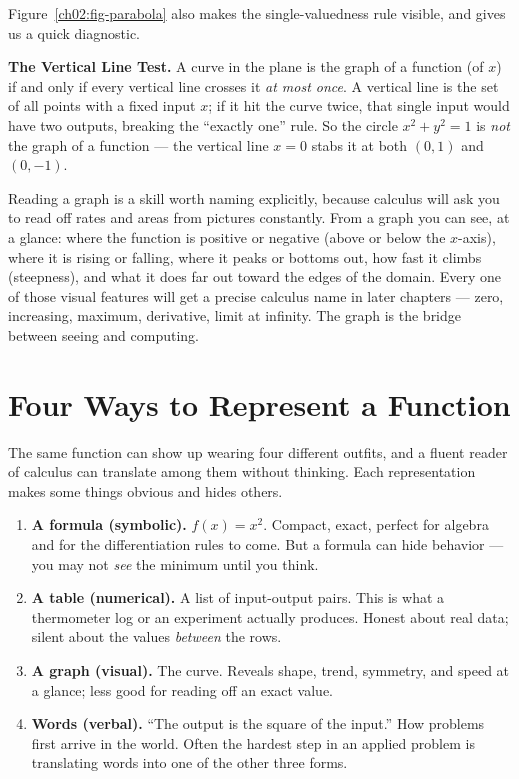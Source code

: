 Figure~\ref{ch02:fig-parabola} also makes the single-valuedness rule visible, and
gives us a quick diagnostic.

\begin{focusbox}
\textbf{The Vertical Line Test.}\quad
A curve in the plane is the graph of a function (of $x$) if and only if every
vertical line crosses it \emph{at most once}. A vertical line is the set of all
points with a fixed input $x$; if it hit the curve twice, that single input would
have two outputs, breaking the ``exactly one'' rule. So the circle $x^2+y^2=1$ is
\emph{not} the graph of a function --- the vertical line $x=0$ stabs it at both
$(0,1)$ and $(0,-1)$.
\end{focusbox}

Reading a graph is a skill worth naming explicitly, because calculus will ask you
to read off rates and areas from pictures constantly. From a graph you can see, at
a glance: where the function is positive or negative (above or below the
$x$-axis), where it is rising or falling, where it peaks or bottoms out, how fast
it climbs (steepness), and what it does far out toward the edges of the domain.
Every one of those visual features will get a precise calculus name in later
chapters --- zero, increasing, maximum, derivative, limit at infinity. The graph is
the bridge between seeing and computing.

\section{Four Ways to Represent a Function}
\label{ch02:four-representations}

The same function can show up wearing four different outfits, and a fluent reader
of calculus can translate among them without thinking. Each representation makes
some things obvious and hides others.

\begin{enumerate}
  \item \textbf{A formula (symbolic).} $f(x) = x^2$. Compact, exact, perfect for
        algebra and for the differentiation rules to come. But a formula can hide
        behavior --- you may not \emph{see} the minimum until you think.
  \item \textbf{A table (numerical).} A list of input-output pairs. This is what a
        thermometer log or an experiment actually produces. Honest about real
        data; silent about the values \emph{between} the rows.
  \item \textbf{A graph (visual).} The curve. Reveals shape, trend, symmetry, and
        speed at a glance; less good for reading off an exact value.
  \item \textbf{Words (verbal).} ``The output is the square of the input.''
        How problems first arrive in the world. Often the hardest step in an
        applied problem is translating words into one of the other three forms.
\end{enumerate}

